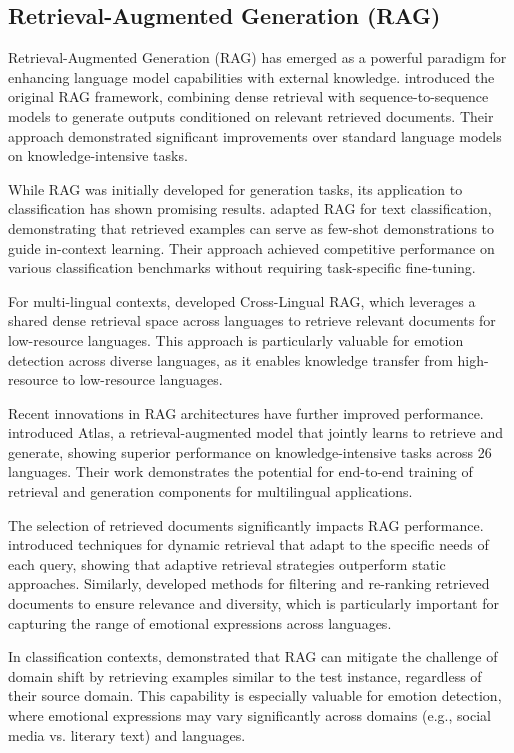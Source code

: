 \documentclass[a4paper,12pt]{extarticle}
\begin{document}
\subsection{Retrieval-Augmented Generation (RAG)}

Retrieval-Augmented Generation (RAG) has emerged as a powerful paradigm for enhancing language model capabilities with external knowledge. \cite{lewis2020retrieval} introduced the original RAG framework, combining dense retrieval with sequence-to-sequence models to generate outputs conditioned on relevant retrieved documents. Their approach demonstrated significant improvements over standard language models on knowledge-intensive tasks.

While RAG was initially developed for generation tasks, its application to classification has shown promising results. \cite{mallen2023retrieval} adapted RAG for text classification, demonstrating that retrieved examples can serve as few-shot demonstrations to guide in-context learning. Their approach achieved competitive performance on various classification benchmarks without requiring task-specific fine-tuning.

For multi-lingual contexts, \cite{shi2023replug} developed Cross-Lingual RAG, which leverages a shared dense retrieval space across languages to retrieve relevant documents for low-resource languages. This approach is particularly valuable for emotion detection across diverse languages, as it enables knowledge transfer from high-resource to low-resource languages.

Recent innovations in RAG architectures have further improved performance. \cite{izacard2022atlas} introduced Atlas, a retrieval-augmented model that jointly learns to retrieve and generate, showing superior performance on knowledge-intensive tasks across 26 languages. Their work demonstrates the potential for end-to-end training of retrieval and generation components for multilingual applications.

The selection of retrieved documents significantly impacts RAG performance. \cite{gao2023retrieval} introduced techniques for dynamic retrieval that adapt to the specific needs of each query, showing that adaptive retrieval strategies outperform static approaches. Similarly, \cite{yu2023improving} developed methods for filtering and re-ranking retrieved documents to ensure relevance and diversity, which is particularly important for capturing the range of emotional expressions across languages.

In classification contexts, \cite{singh2022flare} demonstrated that RAG can mitigate the challenge of domain shift by retrieving examples similar to the test instance, regardless of their source domain. This capability is especially valuable for emotion detection, where emotional expressions may vary significantly across domains (e.g., social media vs. literary text) and languages.
\end{document}
